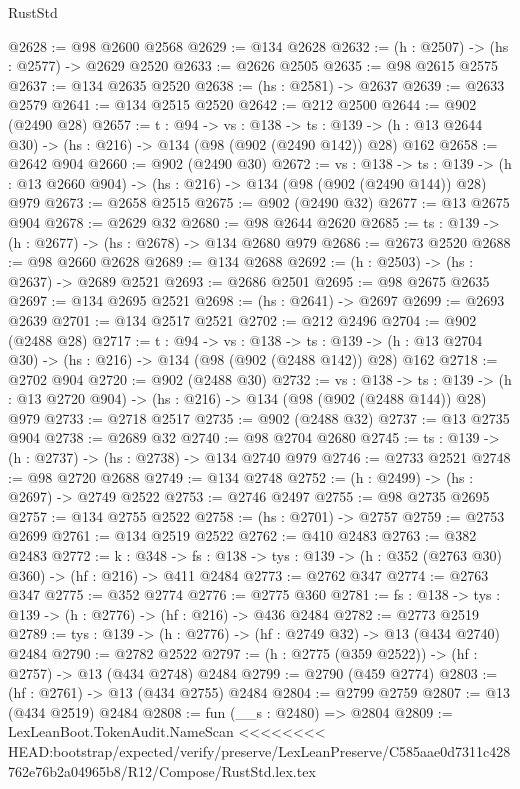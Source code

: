 \begin{lexlean}{RustStd}
\begin{coremodule}
{\begin{coremodule}
{{{{{{{{{@2628 := @98 @2600 @2568
@2629 := @134 @2628
@2632 := (h : @2507) -> (hs : @2577) -> @2629 @2520
@2633 := @2626 @2505
@2635 := @98 @2615 @2575
@2637 := @134 @2635 @2520
@2638 := (hs : @2581) -> @2637
@2639 := @2633 @2579
@2641 := @134 @2515 @2520
@2642 := @212 @2500
@2644 := @902 (@2490 @28)
@2657 := {t : @94} ->
  {vs : @138} ->
  {ts : @139} -> (h : @13 @2644 @30) -> (hs : @216) -> @134 (@98 (@902 (@2490 @142)) @28) @162
@2658 := @2642 @904
@2660 := @902 (@2490 @30)
@2672 := {vs : @138} ->
  {ts : @139} -> (h : @13 @2660 @904) -> (hs : @216) -> @134 (@98 (@902 (@2490 @144)) @28) @979
@2673 := @2658 @2515
@2675 := @902 (@2490 @32)
@2677 := @13 @2675 @904
@2678 := @2629 @32
@2680 := @98 @2644 @2620
@2685 := {ts : @139} -> (h : @2677) -> (hs : @2678) -> @134 @2680 @979
@2686 := @2673 @2520
@2688 := @98 @2660 @2628
@2689 := @134 @2688
@2692 := (h : @2503) -> (hs : @2637) -> @2689 @2521
@2693 := @2686 @2501
@2695 := @98 @2675 @2635
@2697 := @134 @2695 @2521
@2698 := (hs : @2641) -> @2697
@2699 := @2693 @2639
@2701 := @134 @2517 @2521
@2702 := @212 @2496
@2704 := @902 (@2488 @28)
@2717 := {t : @94} ->
  {vs : @138} ->
  {ts : @139} -> (h : @13 @2704 @30) -> (hs : @216) -> @134 (@98 (@902 (@2488 @142)) @28) @162
@2718 := @2702 @904
@2720 := @902 (@2488 @30)
@2732 := {vs : @138} ->
  {ts : @139} -> (h : @13 @2720 @904) -> (hs : @216) -> @134 (@98 (@902 (@2488 @144)) @28) @979
@2733 := @2718 @2517
@2735 := @902 (@2488 @32)
@2737 := @13 @2735 @904
@2738 := @2689 @32
@2740 := @98 @2704 @2680
@2745 := {ts : @139} -> (h : @2737) -> (hs : @2738) -> @134 @2740 @979
@2746 := @2733 @2521
@2748 := @98 @2720 @2688
@2749 := @134 @2748
@2752 := (h : @2499) -> (hs : @2697) -> @2749 @2522
@2753 := @2746 @2497
@2755 := @98 @2735 @2695
@2757 := @134 @2755 @2522
@2758 := (hs : @2701) -> @2757
@2759 := @2753 @2699
@2761 := @134 @2519 @2522
@2762 := @410 @2483
@2763 := @382 @2483
@2772 := {k : @348} ->
  {fs : @138} -> {tys : @139} -> (h : @352 (@2763 @30) @360) -> (hf : @216) -> @411 @2484
@2773 := @2762 @347
@2774 := @2763 @347
@2775 := @352 @2774
@2776 := @2775 @360
@2781 := {fs : @138} -> {tys : @139} -> (h : @2776) -> (hf : @216) -> @436 @2484
@2782 := @2773 @2519
@2789 := {tys : @139} -> (h : @2776) -> (hf : @2749 @32) -> @13 (@434 @2740) @2484
@2790 := @2782 @2522
@2797 := (h : @2775 (@359 @2522)) -> (hf : @2757) -> @13 (@434 @2748) @2484
@2799 := @2790 (@459 @2774)
@2803 := (hf : @2761) -> @13 (@434 @2755) @2484
@2804 := @2799 @2759
@2807 := @13 (@434 @2519) @2484
@2808 := fun (__s : @2480) => @2804
@2809 := LexLeanBoot.TokenAudit.NameScan
<<<<<<<< HEAD:bootstrap/expected/verify/preserve/LexLeanPreserve/C585aae0d7311c428762e76b2a04965b8/R12/Compose/RustStd.lex.tex
}}}}}}}}}
\end{coremodule}}
\end{coremodule}
\end{lexlean}
